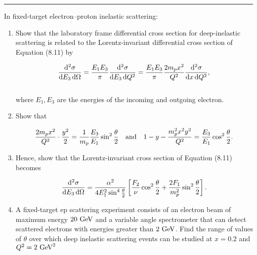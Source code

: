 \noindent\rule{7in}{1.5pt}


\begin{problem}{8.3}
    In fixed-target electron–proton inelastic scattering:
    \begin{enumerate}[label=(\alph*)]
        \item Show that the laboratory frame differential cross section for deep-inelastic scattering is related to the Lorentz-invariant differential cross section of Equation (8.11) by
        
        \begin{align*}
            \frac{\dif^2 \sigma}{\dif E_3 \dif \Omega} = \frac{E_1E_3}{\pi} \frac{\dif^2 \sigma}{\dif E_3 \dif Q^2} =  \frac{E_1E_3}{\pi} \frac{2m_px^2}{Q^2} \frac{\dif^2 \sigma}{\dif x \dif Q^2},
        \end{align*}\\
        where $E_1,E_3$ are the energies of the incoming and outgoing electron. 

        \item Show that
        
        \begin{align*}
            \frac{2m_p x^2}{Q^2} \cdot \frac{y^2}{2} = \frac{1}{m_p} \frac{E_3}{E_1} \sin^2 \frac{\theta}{2} \quad \text{and} \quad 1-y-\frac{m_p^2x^2y^2}{Q^2} = \frac{E_3}{E_1} \cos^2 \frac{\theta}{2}.
        \end{align*}

        \item Hence, show that the Lorentz-invariant cross section of Equation (8.11) becomes
        
        \begin{align*}
            \frac{\mathop{}\!\mathrm{d}^2 \sigma}{\mathop{}\!\mathrm{d} E_3 \mathop{}\!\mathrm{d} \Omega} = \frac{\alpha^2}{4E_1^2 \sin^4 \frac{\theta}{2}} \left[ \frac{F_2}{\nu}\cos^2\frac{\theta}{2} + \frac{2F_1}{m_p^2} \sin^2 \frac{\theta}{2} \right].
        \end{align*}

        \item A fixed-target ep scattering experiment consists of an electron beam of maximum energy $20 \text{ GeV}$ and a variable angle spectrometer that can detect scattered electrons with energies greater than $2 \text{ GeV}$. Find the range of values of $\theta$ over which deep inelastic scattering events can be studied at $x = 0.2$ and $Q^2 = 2 \text{ GeV}^2$
    \end{enumerate}
\end{problem}
\begin{solution}

\end{solution}

